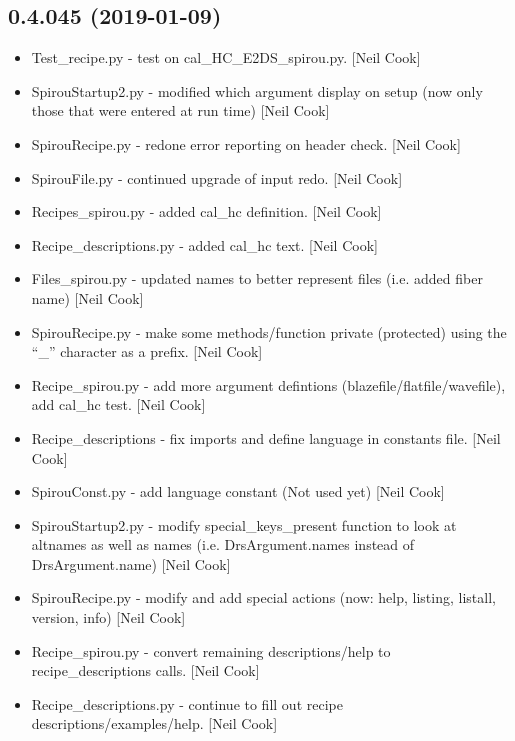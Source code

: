 \documentclass[a4paper,10pt,english]{report}
\begin{document}
\subsection{0.4.045 (2019-01-09)}
\label{\detokenize{misc/changelog:id218}}\begin{itemize}
\item {} 
Test\_recipe.py - test on cal\_HC\_E2DS\_spirou.py. {[}Neil Cook{]}

\item {} 
SpirouStartup2.py - modified which argument display on setup (now only
those that were entered at run time) {[}Neil Cook{]}

\item {} 
SpirouRecipe.py - redone error reporting on header check. {[}Neil Cook{]}

\item {} 
SpirouFile.py - continued upgrade of input redo. {[}Neil Cook{]}

\item {} 
Recipes\_spirou.py - added cal\_hc definition. {[}Neil Cook{]}

\item {} 
Recipe\_descriptions.py - added cal\_hc text. {[}Neil Cook{]}

\item {} 
Files\_spirou.py - updated names to better represent files (i.e. added
fiber name) {[}Neil Cook{]}

\item {} 
SpirouRecipe.py - make some methods/function private (protected) using
the “\_” character as a prefix. {[}Neil Cook{]}

\item {} 
Recipe\_spirou.py - add more argument defintions
(blazefile/flatfile/wavefile), add cal\_hc test. {[}Neil Cook{]}

\item {} 
Recipe\_descriptions - fix imports and define language in constants
file. {[}Neil Cook{]}

\item {} 
SpirouConst.py - add language constant (Not used yet) {[}Neil Cook{]}

\item {} 
SpirouStartup2.py - modify special\_keys\_present function to look at
altnames as well as names (i.e. DrsArgument.names instead of
DrsArgument.name) {[}Neil Cook{]}

\item {} 
SpirouRecipe.py - modify and add special actions (now: \textendash{}help,
\textendash{}listing, \textendash{}listall, \textendash{}version, \textendash{}info) {[}Neil Cook{]}

\item {} 
Recipe\_spirou.py - convert remaining descriptions/help to
recipe\_descriptions calls. {[}Neil Cook{]}

\item {} 
Recipe\_descriptions.py - continue to fill out recipe
descriptions/examples/help. {[}Neil Cook{]}

\end{itemize}
\end{document}

